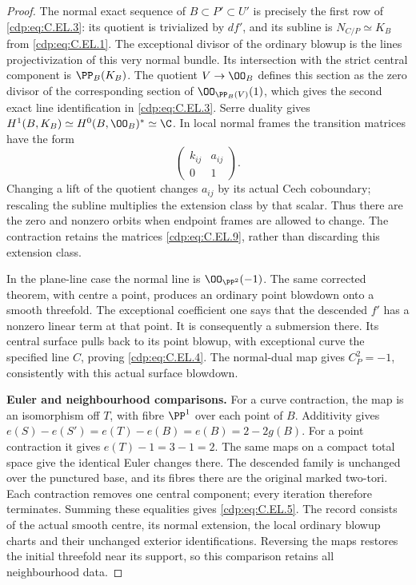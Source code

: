 \begin{proof}
The normal exact sequence of $B\subset P'\subset U'$ is
precisely the first row of \eqref{cdp:eq:C.EL.3}: its quotient is trivialized
by $df'$, and its subline is $N_{C/P}\simeq K_B$ from
\eqref{cdp:eq:C.EL.1}. The exceptional divisor of the ordinary blowup is
the lines projectivization of this very normal bundle. Its
intersection with the strict central component is
$\PP_B(K_B)$. The quotient $V\to\OO_B$ defines this section
as the zero divisor of the corresponding section of
$\OO_{\PP_B(V)}(1)$, which gives the second exact line
identification in \eqref{cdp:eq:C.EL.3}. Serre duality gives
$H^1(B,K_B)\simeq H^0(B,\OO_B)^*\simeq\C$.
In local normal frames the transition matrices have the form
\[
        \begin{pmatrix}k_{ij}&a_{ij}\\0&1\end{pmatrix}.
                                                        \tag{C.EL.9}\label{cdp:eq:C.EL.9}
\]
Changing a lift of the quotient changes $a_{ij}$ by its
actual Cech coboundary; rescaling the subline multiplies the
extension class by that scalar. Thus there are the zero and
nonzero orbits when endpoint frames are allowed to change.
The contraction retains the matrices \eqref{cdp:eq:C.EL.9}, rather than
discarding this extension class.

In the plane-line case the normal line is $\OO_{\PP^2}(-1)$.
The same corrected theorem, with centre a point, produces an
ordinary point blowdown onto a smooth threefold. The exceptional
coefficient one says that the descended $f'$ has a nonzero
linear term at that point. It is consequently a submersion
there. Its central surface pulls back to its point blowup,
with exceptional curve the specified line $C$, proving
\eqref{cdp:eq:C.EL.4}. The normal-dual map gives $C^2_P=-1$, consistently
with this actual surface blowdown.

\par\medskip\noindent\textbf{Euler and neighbourhood comparisons.}
For a curve contraction, the map is an isomorphism off $T$,
with fibre $\PP^1$ over each point of $B$. Additivity gives
$e(S)-e(S')=e(T)-e(B)=e(B)=2-2g(B)$.
For a point contraction it gives $e(T)-1=3-1=2$.
The same maps on a compact total space give the identical
Euler changes there. The descended family is unchanged over
the punctured base, and its fibres there are the original
marked two-tori. Each contraction removes one central
component; every iteration therefore terminates. Summing
these equalities gives \eqref{cdp:eq:C.EL.5}. The record consists of the
actual smooth centre, its normal extension, the local ordinary
blowup charts and their unchanged exterior identifications.
Reversing the maps restores the initial threefold near its
support, so this comparison retains all neighbourhood data.


\end{proof}
